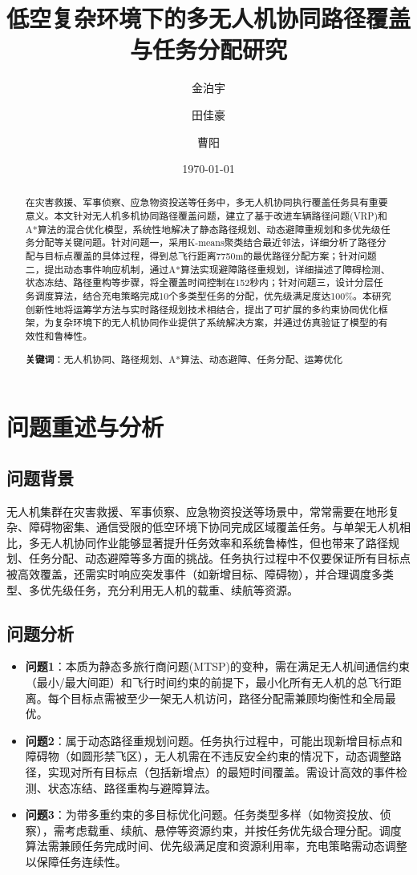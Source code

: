 \documentclass[12pt,fontset=adobe]{ctexart}
\title{低空复杂环境下的多无人机协同路径覆盖与任务分配研究}
\author{金泊宇\and 田佳豪 \and 曹阳}
\date{\today}
\begin{document}

\begin{abstract}
  在灾害救援、军事侦察、应急物资投送等任务中，多无人机协同执行覆盖任务具有重要意义。本文针对无人机多机协同路径覆盖问题，建立了基于改进车辆路径问题(VRP)和A*算法的混合优化模型，系统性地解决了静态路径规划、动态避障重规划和多优先级任务分配等关键问题。针对问题一，采用K-means聚类结合最近邻法，详细分析了路径分配与目标点覆盖的具体过程，得到总飞行距离7750m的最优路径分配方案；针对问题二，提出动态事件响应机制，通过A*算法实现避障路径重规划，详细描述了障碍检测、状态冻结、路径重构等步骤，将全覆盖时间控制在152秒内；针对问题三，设计分层任务调度算法，结合充电策略完成10个多类型任务的分配，优先级满足度达100\%。本研究创新性地将运筹学方法与实时路径规划技术相结合，提出了可扩展的多约束协同优化框架，为复杂环境下的无人机协同作业提供了系统解决方案，并通过仿真验证了模型的有效性和鲁棒性。

  \textbf{关键词}：无人机协同、路径规划、A*算法、动态避障、任务分配、运筹优化
\end{abstract}

\section{问题重述与分析}

\subsection{问题背景}
无人机集群在灾害救援、军事侦察、应急物资投送等场景中，常常需要在地形复杂、障碍物密集、通信受限的低空环境下协同完成区域覆盖任务。与单架无人机相比，多无人机协同作业能够显著提升任务效率和系统鲁棒性，但也带来了路径规划、任务分配、动态避障等多方面的挑战。任务执行过程中不仅要保证所有目标点被高效覆盖，还需实时响应突发事件（如新增目标、障碍物），并合理调度多类型、多优先级任务，充分利用无人机的载重、续航等资源。

\subsection{问题分析}
\begin{itemize}
  \item \textbf{问题1}：本质为静态多旅行商问题(MTSP)的变种，需在满足无人机间通信约束（最小/最大间距）和飞行时间约束的前提下，最小化所有无人机的总飞行距离。每个目标点需被至少一架无人机访问，路径分配需兼顾均衡性和全局最优。
  \item \textbf{问题2}：属于动态路径重规划问题。任务执行过程中，可能出现新增目标点和障碍物（如圆形禁飞区），无人机需在不违反安全约束的情况下，动态调整路径，实现对所有目标点（包括新增点）的最短时间覆盖。需设计高效的事件检测、状态冻结、路径重构与避障算法。
  \item \textbf{问题3}：为带多重约束的多目标优化问题。任务类型多样（如物资投放、侦察），需考虑载重、续航、悬停等资源约束，并按任务优先级合理分配。调度算法需兼顾任务完成时间、优先级满足度和资源利用率，充电策略需动态调整以保障任务连续性。
\end{itemize}
\end{document}
